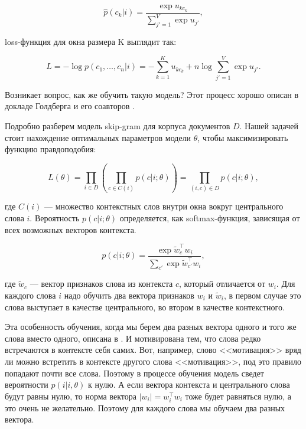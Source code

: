 \begin{equation}
 \hat{p}(c_k|i) = \frac{\exp{u_{kc_k}}}{\sum_{j'=1}^V \exp{u_{j'}}},
\end{equation}

loss-функция для окна размера K выглядит так:

\begin{equation}
 L = -\log{p(c_1, \ldots, c_n|i)} = - \sum_{k=1}^{K} u_{kc_k} + n\log{\sum_{j'=1}^{V} \exp{u_{j'}}}.
\end{equation}

Возникает вопрос, как же обучить такую модель? Этот процесс хорошо описан в докладе Голдберга и его соавторов \cite{Goldberg}.

\bigskip
Подробно разберем модель skip-gram для корпуса документов $D$. Нашей задачей стоит нахождение оптимальных параметров модели $\theta$, чтобы максимизировать функцию правдоподобия:

\begin{equation} \label{eq:likelyhood}
 L(\theta)=\prod_{i\in D}\left(\prod_{c\in C(i)} p(c|i;\theta)\right) = \prod_{(i,c)\in D}p(c|i;\theta),
\end{equation}

где $C(i)$ --- множество контекстных слов внутри окна вокруг центрального слова $i$. Вероятность $p(c|i;\theta )$ определяется, как softmax-функция, зависящая от всех возможных векторов контекста.

\begin{equation} \label{eq:generalSoftmax}
 p(c|i;\theta) = \frac{\exp{\tilde{w}_c^\top w_i}}{\sum_{c'} \exp{\tilde{w}_{c'}^\top w_i}},
\end{equation}

где $\tilde{w}_c$ --- вектор признаков слова из контекста $c$, который отличается от $w_i$. Для каждого слова $i$ надо обучить два вектора признаков $w_i$ и $\tilde{w}_i$, в первом случае это слова выступает в качестве центрального, во втором в качестве контекстного.

\bigskip
Эта особенность обучения, когда мы берем два разных вектора одного и того же слова вместо одного, описана в \cite{Goldberg}. И мотивирована тем, что слова редко встречаются в контексте себя самих. Вот, например, слово <<мотивация>> вряд ли можно встретить в контексте другого слова <<мотивация>>, под это правило попадают почти все слова. Поэтому в процессе обучения модель сведет вероятности $p(i|i, \theta)$ к нулю. А если вектора контекста и центрального слова будут равны нулю, то норма вектора $|w_i| = w_i^\top w_i$ тоже будет равняться нулю, а это очень не желательно. Поэтому для каждого слова мы обучаем два разных вектора.

